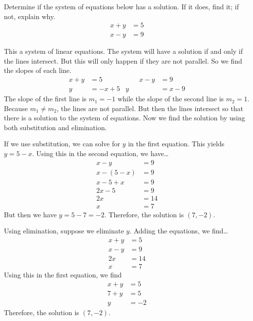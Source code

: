 \documentclass[11pt,letterpaper]{article}
\begin{document}

 Determine if the system of equations below has a solution. If it does, find it; if not, explain why. \pspace
	\[
	\begin{aligned}
	x + y&= 5 \\
	x - y&= 9
	\end{aligned}
	\] \pspace

\sol This a system of linear equations. The system will have a solution if and only if the lines intersect. But this will only happen if they are not parallel. So we find the slopes of each line.
	\[
	\begin{aligned}
	x + y&= 5 &\quad\quad x - y&= 9 \\
	y&= -x + 5 & y&= x - 9
	\end{aligned}
	\]
The slope of the first line is $m_1= -1$ while the slope of the second line is $m_2= 1$. Because $m_1 \neq m_2$, the lines are not parallel. But then the lines intersect so that there is a solution to the system of equations. Now we find the solution by using both substitution and elimination. 

If we use substitution, we can solve for $y$ in the first equation. This yields $y= 5 - x$. Using this in the second equation, we have\dots
	\[
	\begin{aligned}
	x - y&= 9 \\
	x - (5 - x)&= 9 \\
	x - 5 + x&= 9 \\
	2x - 5&= 9 \\
	2x&= 14 \\
	x&= 7
	\end{aligned}
	\]
But then we have $y= 5 - 7= -2$. Therefore, the solution is $(7, -2)$. \pspace

Using elimination, suppose we eliminate $y$. Adding the equations, we find\dots
	\[
	\begin{aligned}
	x + y&= 5 \\
	x - y&= 9 \\ \hline
	2x&= 14 \\
	x&= 7
	\end{aligned}
	\] 
Using this in the first equation, we find
	\[
	\begin{aligned}
	x + y&= 5 \\
	7 + y&= 5 \\
	y&= -2
	\end{aligned}
	\]
Therefore, the solution is $(7, -2)$. 
\end{document}
